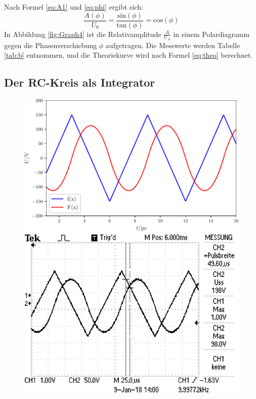 \noindent Nach Formel \eqref{eq:A1} und \eqref{eq:phi} ergibt sich:
\begin{equation}
\frac{A(\phi)}{U_0}=\frac{\mathrm{sin}(\phi)}{\mathrm{tan}(\phi)}=\mathrm{cos}(\phi) \label{eq:theo}
\end{equation}
In Abbildung \ref{fig:Graph4} ist die Relativamplitude $\frac{A}{U_.0}$ in einem Polardiagramm gegen die Phasenverschiebung $\phi$ aufgetragen. Die Messwerte werden Tabelle \ref{tab:b} entnommen, und die Theoriekurve wird nach Formel \eqref{eq:theo} berechnet. 

\subsection{Der RC-Kreis als Integrator}
\begin{figure}
\centering
\begin{minipage}{0.48\textwidth}
\centering
\includegraphics[width=\linewidth-10pt,height=\textheight-10pt,keepaspectratio]{content/images/Graph5.pdf}
\end{minipage}
\begin{minipage}{0.48\textwidth}
\centering
\includegraphics[width=\linewidth-10pt,height=\textheight-10pt,keepaspectratio]{content/images/5.jpg}
\end{minipage}


\end{figure}
